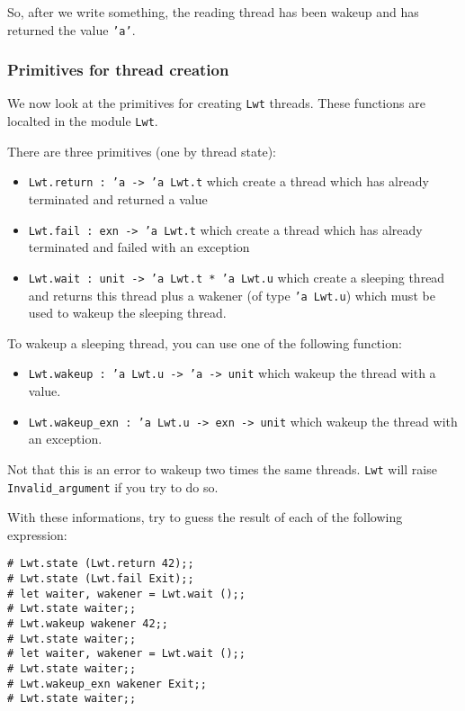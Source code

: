 \documentclass{article}
\newcommand{\lwt}{\texttt{Lwt}\xspace}
\begin{document}
So, after we write something, the reading thread has been wakeup and
has returned the value \texttt{'a'}.

\subsubsection{Primitives for thread creation}

We now look at the primitives for creating \lwt threads. These
functions are localted in the module \texttt{Lwt}.

There are three primitives (one by thread state):

\begin{itemize}
\item \texttt{Lwt.return : 'a -> 'a Lwt.t} which create a thread which has already
  terminated and returned a value
\item \texttt{Lwt.fail : exn -> 'a Lwt.t} which create a thread which
  has already terminated and failed with an exception
\item \texttt{Lwt.wait : unit -> 'a Lwt.t * 'a Lwt.u} which create a
  sleeping thread and returns this thread plus a wakener (of type
  \texttt{'a Lwt.u}) which must be used to wakeup the sleeping thread.
\end{itemize}

To wakeup a sleeping thread, you can use one of the following
function:

\begin{itemize}
\item \texttt{Lwt.wakeup : 'a Lwt.u -> 'a -> unit} which wakeup the
  thread with a value.
\item \texttt{Lwt.wakeup\_exn : 'a Lwt.u -> exn -> unit} which wakeup
  the thread with an exception.
\end{itemize}

Not that this is an error to wakeup two times the same threads. \lwt
will raise \texttt{Invalid\_argument} if you try to do so.

With these informations, try to guess the result of each of the
following expression:

\begin{verbatim}
# Lwt.state (Lwt.return 42);;
# Lwt.state (Lwt.fail Exit);;
# let waiter, wakener = Lwt.wait ();;
# Lwt.state waiter;;
# Lwt.wakeup wakener 42;;
# Lwt.state waiter;;
# let waiter, wakener = Lwt.wait ();;
# Lwt.state waiter;;
# Lwt.wakeup_exn wakener Exit;;
# Lwt.state waiter;;
\end{verbatim}
\end{document}
